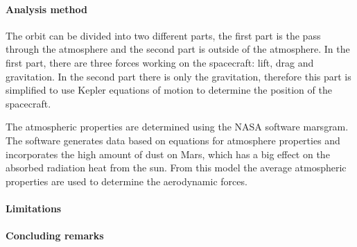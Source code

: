 \paragraph{Analysis method}
The orbit can be divided into two different parts, the first part is the pass through the atmosphere and the second part is outside of the atmosphere. In the first part, there are three forces working on the spacecraft: lift, drag and gravitation. In the second part there is only the gravitation, therefore this part is simplified to use Kepler equations of motion to determine the position of the spacecraft.

The atmospheric properties are determined using the NASA software \gls{marsgram}. The software generates data based on equations for atmosphere properties and incorporates the high amount of dust on Mars, which has a big effect on the absorbed radiation heat from the sun. From this model the average atmospheric properties are used to determine the aerodynamic forces.


\paragraph{Limitations}


\paragraph{Concluding remarks}


